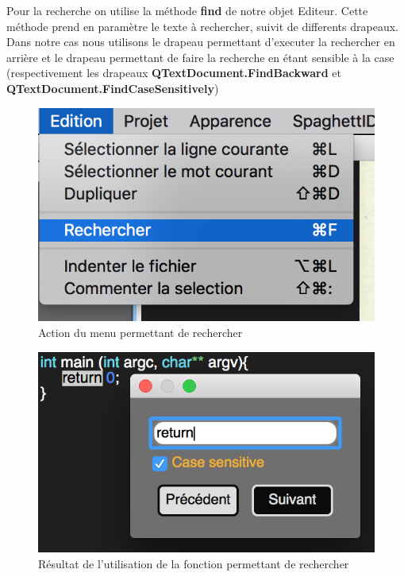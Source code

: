 \documentclass[a4paper,12pt]{article}
\begin{document}
	Pour la recherche on utilise la méthode \textbf{find} de notre objet Editeur. Cette méthode prend en paramètre le texte à rechercher, suivit de differents drapeaux. Dans notre cas nous utilisons le drapeau permettant d'executer la rechercher en arrière et le drapeau permettant de faire la recherche en étant sensible à la case (respectivement les drapeaux \textbf{QTextDocument.FindBackward} et \textbf{QTextDocument.FindCaseSensitively})

	\begin{figure}[h!]
		\begin{center}
			\includegraphics[scale=0.8]{images/imgs_edit/utilisation_rechercher}
			\caption{Action du menu permettant de rechercher}
		\end{center}
	\end{figure}

	\begin{figure}[h!]
		\begin{center}
			\includegraphics[scale=0.8]{images/imgs_edit/resultat_rechercher}
			\caption{Résultat de l'utilisation de la fonction permettant de rechercher}
		\end{center}
	\end{figure}
	\newpage
\end{document}
